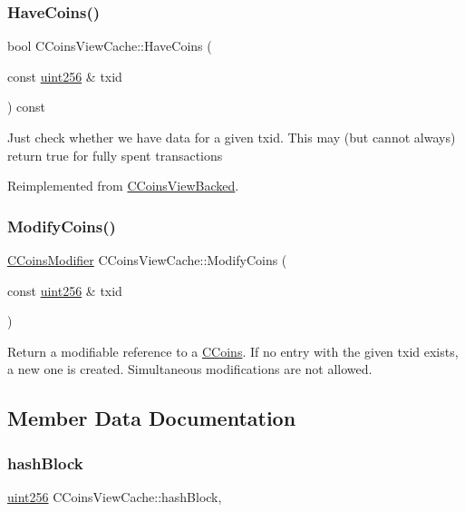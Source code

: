 \subsubsection{\texorpdfstring{HaveCoins()}{HaveCoins()}}
{\footnotesize\ttfamily bool C\+Coins\+View\+Cache\+::\+Have\+Coins (\begin{DoxyParamCaption}\item[{const \mbox{\hyperlink{classuint256}{uint256}} \&}]{txid }\end{DoxyParamCaption}) const\hspace{0.3cm}{\ttfamily [virtual]}}

Just check whether we have data for a given txid. This may (but cannot always) return true for fully spent transactions 

Reimplemented from \mbox{\hyperlink{class_c_coins_view_backed_ad49041658bdec807d556e080476e6543}{C\+Coins\+View\+Backed}}.

\mbox{\label{class_c_coins_view_cache_ab67c0d489873ed735c4fc52aa66f0830}} 
\subsubsection{\texorpdfstring{ModifyCoins()}{ModifyCoins()}}
{\footnotesize\ttfamily \mbox{\hyperlink{class_c_coins_modifier}{C\+Coins\+Modifier}} C\+Coins\+View\+Cache\+::\+Modify\+Coins (\begin{DoxyParamCaption}\item[{const \mbox{\hyperlink{classuint256}{uint256}} \&}]{txid }\end{DoxyParamCaption})}

Return a modifiable reference to a \mbox{\hyperlink{class_c_coins}{C\+Coins}}. If no entry with the given txid exists, a new one is created. Simultaneous modifications are not allowed. 

\subsection{Member Data Documentation}
\mbox{\label{class_c_coins_view_cache_a229dddddbc5501edc250209a2ce5df8b}} 
\subsubsection{\texorpdfstring{hashBlock}{hashBlock}}
{\footnotesize\ttfamily \mbox{\hyperlink{classuint256}{uint256}} C\+Coins\+View\+Cache\+::hash\+Block\hspace{0.3cm}{\ttfamily [mutable]}, {\ttfamily [protected]}}

